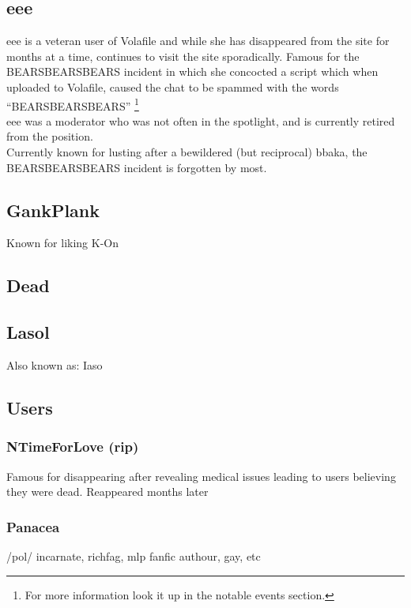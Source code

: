 \documentclass[12pt]{report}
\begin{document}
{{        \subsection{eee}
        eee is a veteran user of Volafile and while she has disappeared
        from the site for months at a time, continues to visit the site
        sporadically. Famous for the BEARSBEARSBEARS incident in which
        she concocted a script which when uploaded to Volafile, caused
        the chat to be spammed with the words ``BEARSBEARSBEARS''
        \footnote{For more information look it up in the notable events section.}\\
        eee was a moderator who was not often in the spotlight,
        and is currently retired from the position. \\Currently known for
        lusting after a bewildered (but reciprocal) bbaka,
        the BEARSBEARSBEARS incident is forgotten by most.

        \subsection{GankPlank}
        Known for liking K-On

        \subsection{Dead}

        \subsection{Lasol}
        Also known as: Iaso

        \vfill
        \pagebreak

        \subsection{Users}

        \subsubsection{NTimeForLove (rip)}
        Famous for disappearing after revealing medical issues leading
        to users believing they were dead. Reappeared months later

        \subsubsection{Panacea}
        /pol/ incarnate, richfag, mlp fanfic authour, gay, etc

}}
\end{document}
